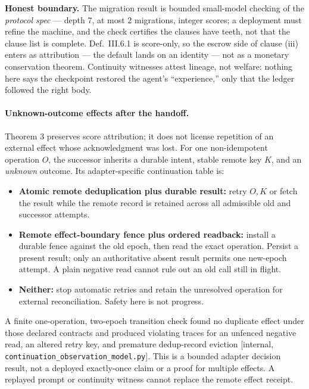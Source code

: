 \documentclass[11pt,a4paper]{article}
\begin{document}
\begin{boundary}
\textbf{Honest boundary.} The migration result is bounded small-model checking of the \emph{protocol spec} --- depth 7, at most 2
migrations, integer scores; a deployment must refine the machine, and the check certifies the clauses have teeth, not that the
clause list is complete. Def.~III.6.1 is score-only, so the escrow side of clause (iii) enters as attribution --- the default lands
on an identity --- not as a monetary conservation theorem. Continuity witnesses attest lineage, not welfare: nothing here says the
checkpoint restored the agent's ``experience,'' only that the ledger followed the right body.
\end{boundary}

\paragraph{Unknown-outcome effects after the handoff.}\label{sec:unknown-effect}
Theorem 3 preserves score attribution; it does not license repetition of an
external effect whose acknowledgment was lost. For one non-idempotent operation
$O$, the successor inherits a durable intent, stable remote key $K$, and an
\emph{unknown} outcome. Its adapter-specific continuation table is:
\begin{itemize}
\item \textbf{Atomic remote deduplication plus durable result:} retry $O,K$ or
fetch the result while the remote record is retained across all admissible
old and successor attempts.
\item \textbf{Remote effect-boundary fence plus ordered readback:} install a
durable fence against the old epoch, then read the exact operation. Persist a
present result; only an authoritative absent result permits one new-epoch
attempt. A plain negative read cannot rule out an old call still in flight.
\item \textbf{Neither:} stop automatic retries and retain the unresolved
operation for external reconciliation. Safety here is not progress.
\end{itemize}
A finite one-operation, two-epoch transition check found no duplicate effect
under those declared contracts and produced violating traces for an unfenced
negative read, an altered retry key, and premature dedup-record eviction
[internal, \texttt{continuation\_\allowbreak observation\_\allowbreak model.py}]. This is a bounded
adapter decision result, not a deployed exactly-once claim or a proof for
multiple effects. A replayed prompt or continuity witness cannot replace the
remote effect receipt.
\end{document}
